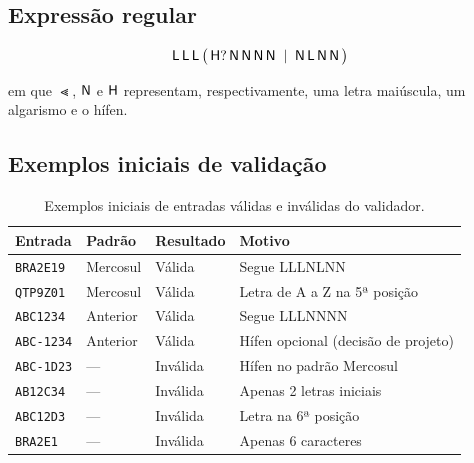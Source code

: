 \subsection{Expressão regular}

\[
  \mathsf{L}\,\mathsf{L}\,\mathsf{L}\,\big(\,\mathsf{H}?\,\mathsf{N}\,\mathsf{N}\,\mathsf{N}\,\mathsf{N} \;\mid\; \mathsf{N}\,\mathsf{L}\,\mathsf{N}\,\mathsf{N}\,\big)
\]

em que $\Lt$, $\mathsf{N}$ e $\mathsf{H}$ representam, respectivamente, uma letra
maiúscula, um algarismo e o hífen.

\subsection{Exemplos iniciais de validação}

\begin{table}[h]
\centering
\begin{tabular}{lllp{6cm}}
\toprule
Entrada & Padrão & Resultado & Motivo \\
\midrule
\texttt{BRA2E19}  & Mercosul & Válida   & Segue LLLNLNN \\
\texttt{QTP9Z01}  & Mercosul & Válida   & Letra de A a Z na 5ª posição \\
\texttt{ABC1234}  & Anterior & Válida   & Segue LLLNNNN \\
\texttt{ABC-1234} & Anterior & Válida   & Hífen opcional (decisão de projeto) \\
\texttt{ABC-1D23} & ---      & Inválida & Hífen no padrão Mercosul \\
\texttt{AB12C34}  & ---      & Inválida & Apenas 2 letras iniciais \\
\texttt{ABC12D3}  & ---      & Inválida & Letra na 6ª posição \\
\texttt{BRA2E1}   & ---      & Inválida & Apenas 6 caracteres \\
\bottomrule
\end{tabular}
\caption{Exemplos iniciais de entradas válidas e inválidas do validador.}
\label{tab:exemplos-especificacao}
\end{table}